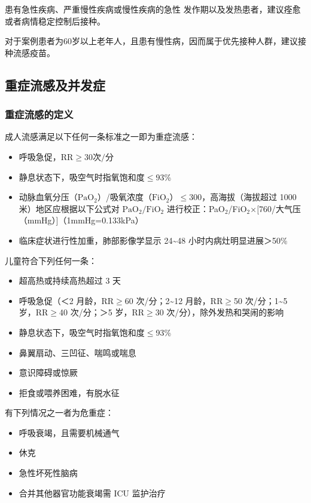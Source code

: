 \documentclass[9pt,a4paper,twoside]{rho-class/rho}
\begin{document}
    患有急性疾病、严重慢性疾病或慢性疾病的急性 发作期以及发热患者，建议痊愈或者病情稳定控制后接种。
    
    对于案例患者为60岁以上老年人，且患有慢性病，因而属于优先接种人群，建议接种流感疫苗。


    \subsection{重症流感及并发症}

    \subsubsection{重症流感的定义}

    成人流感满足以下任何一条标准之一即为重症流感：
    \begin{itemize}
        \item 呼吸急促，$\mathrm{RR}\ge30 \text{次/分}$
        \item 静息状态下，吸空气时指$\text{氧饱和度}\le93$\%
        \item 动脉血氧分压（$\text{PaO}_2$）/吸氧浓度（$\text{FiO}_2$）$\le300$，高海拔（海拔超过 1000 米）地区应根据以下公式对 $\text{PaO}_2/\text{FiO}_2$ 进行校正：PaO$_2$/FiO$_2$×[760/大气压（mmHg）]（1mmHg=0.133kPa）
        \item 临床症状进行性加重，肺部影像学显示 24\textasciitilde48 小时内病灶明显进展＞50\%
    \end{itemize}

    儿童符合下列任何一条：

    \begin{itemize}
        \item 超高热或持续高热超过 3 天
        \item 呼吸急促（＜2 月龄，RR$\ge60$ 次/分；2\textasciitilde12 月龄，RR$\ge$50 次/分；1\textasciitilde5 岁，RR$\ge$40 次/分；＞5 岁，RR$\ge$30 次/分），除外发热和哭闹的影响
        \item 静息状态下，吸空气时指氧饱和度$\le$93\%
        \item 鼻翼扇动、三凹征、喘鸣或喘息
        \item 意识障碍或惊厥
        \item 拒食或喂养困难，有脱水征
    \end{itemize}
    
    有下列情况之一者为危重症：
    \begin{itemize}
        \item 呼吸衰竭，且需要机械通气
        \item 休克
        \item 急性坏死性脑病
        \item 合并其他器官功能衰竭需 ICU 监护治疗
    \end{itemize}
\end{document}
